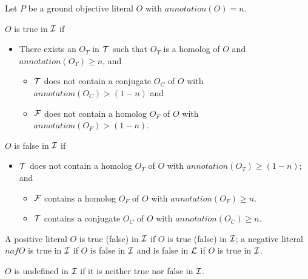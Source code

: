 \begin{definition} \label{def:satisfiable}
Let $P$ be a ground objective literal $O$ with
$annotation(O) = n$.

$O$ is true in $\cI$ if
\begin{itemize}
\item There exists an $O_T$ in $\cT$ such that $O_T$ is a homolog of
  $O$ and $annotation(O_T) \geq n$, and
\begin{itemize}
\item $\cT$ does not contain a conjugate $O_C$ of $O$ with
  $annotation(O_C) > (1-n)$ and
\item $\cF$ does not contain a homolog $O_F$ of $O$ with $annotation(O_F) > (1-n)$.
\end{itemize}
\end{itemize}

$O$ is false in $\cI$ if 
\begin{itemize}
\item $\cT$ does not contain a homolog $O_T$ of $O$ with
  $annotation(O_T) \geq (1-n)$; and 
\begin{itemize}
\item $\cF$ contains a homolog $O_F$ of $O$ with $annotation(O_F) \geq n$.
\item $\cT$ contains a conjugate $O_C$ of $O$ with $annotation(O_C) \geq n$.
\end{itemize}
\end{itemize}
A positive literal $O$ is true (false) in $\cI$ if $O$ is true (false)
in $\cI$; a negative literal $naf O$ is true in $\cI$ if $O$ is false
in $\cI$ and is false in $\cL$ if $O$ is true in $\cI$.

$O$ is undefined in $\cI$ if it is neither true nor false in $\cI$.
\end{definition}


